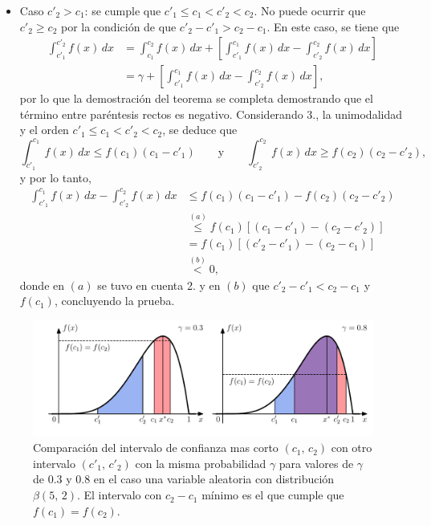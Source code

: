 \documentclass[a4paper]{report}
\begin{document}
\begin{itemize}
\begin{itemize}
  \item Caso \(c'_2>c_1\): se cumple que \(c'_1\leq c_1<c'_2<c_2\). No puede ocurrir que \(c'_2\geq c_2\) por la condición de que \(c'_2-c'_1>c_2-c_1\). En este caso, se tiene que 
  \begin{align*}
   \int_{c'_1}^{c'_2}f(x)\,dx&=\int_{c_1}^{c_2}f(x)\,dx+\left[\int_{c'_1}^{c_1}f(x)\,dx-\int_{c'_2}^{c_2}f(x)\,dx\right]\\
    &=\gamma+\left[\int_{c'_1}^{c_1}f(x)\,dx-\int_{c'_2}^{c_2}f(x)\,dx\right],
  \end{align*}
  por lo que la demostración del teorema se completa demostrando que el término entre paréntesis rectos es negativo. Considerando 3., la unimodalidad y el orden \(c'_1\leq c_1<c'_2<c_2\), se deduce que
  \[
   \int_{c'_1}^{c_1}f(x)\,dx\leq f(c_1)(c_1-c'_1)
   \qquad\textrm{y}\qquad
   \int_{c'_2}^{c_2}f(x)\,dx\geq f(c_2)(c_2-c'_2),
  \]
  y por lo tanto,
  \begin{align*}
   \int_{c'_1}^{c_1}f(x)\,dx-\int_{c'_2}^{c_2}f(x)\,dx&\leq f(c_1)(c_1-c'_1)-f(c_2)(c_2-c'_2)\\
    &\overset{(a)}{\leq} f(c_1)\left[(c_1-c'_1)-(c_2-c'_2)\right]\\
    &=f(c_1)\left[(c'_2-c'_1)-(c_2-c_1)\right]\\
    &\overset{(b)}{<}0,
  \end{align*}
  donde en \((a)\) se tuvo en cuenta 2. y en \((b)\) que \(c'_2-c'_1<c_2-c_1\) y \(f(c_1)\), concluyendo la prueba.  
 \end{itemize}
\end{itemize}
\begin{figure}[!htb]
\begin{center}
\includegraphics[width=0.95\columnwidth]{figuras/shortest_prediction_interval.pdf}
\caption{\label{fig:shortest_prediction_interval} Comparación del intervalo de confianza mas corto \((c_1,\,c_2)\) con otro intervalo \((c'_1,\,c'_2)\) con la misma probabilidad \(\gamma\) para valores de \(\gamma\) de 0.3 y 0.8 en el caso una variable aleatoria con distribución \(\beta(5,\,2)\). El intervalo con \(c_2-c_1\) mínimo es el que cumple que \(f(c_1)=f(c_2)\).}
\end{center}
\end{figure}
\end{document}
